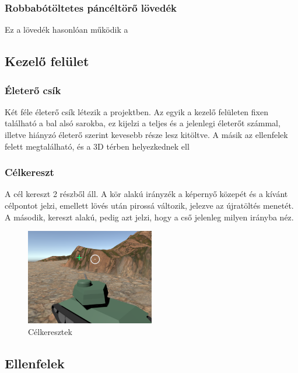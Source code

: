 \documentclass[
]{thesis-ekf}
\theoremstyle{definition}
\theoremstyle{remark}
\begin{document}
\subsubsection{Robbabótöltetes páncéltörő lövedék}

Ez a lövedék hasonlóan működik a

\subsection{Kezelő felület}

\subsubsection{Életerő csík}

Két féle életerő csík létezik a projektben. Az egyik a kezelő felületen fixen található a bal alsó sarokba, ez kijelzi a teljes és a jelenlegi életerőt számmal, illetve hiányzó életerő szerint kevesebb része lesz kitöltve. A másik az ellenfelek felett megtalálható, és a 3D térben helyezkednek ell

\subsubsection{Célkereszt}

A cél kereszt 2 részből áll. A kör alakú irányzék a képernyő közepét és a kívánt célpontot jelzi, emellett lövés után pirossá változik, jelezve az újratöltés menetét. A második, kereszt alakú, pedig azt jelzi, hogy a cső jelenleg milyen irányba néz.

\begin{figure}[h]
    \centering
    \includegraphics[width=0.5\textwidth]{screenshots/crosshair.png}
    \caption{Célkeresztek}
    \label{fig:crosshair}
\end{figure}

\subsection{Ellenfelek}
\end{document}
